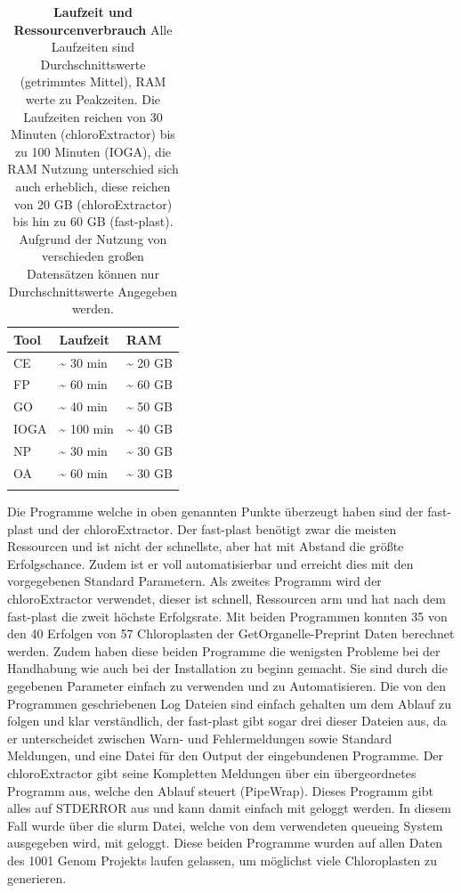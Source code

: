 \documentclass{scrartcl}
\begin{document}
\begin{table}[!h]
\caption[Laufzeit und Ressourcenverbrauch]{\textbf{Laufzeit und Ressourcenverbrauch} Alle Laufzeiten sind Durchschnittswerte (getrimmtes Mittel), RAM werte zu Peakzeiten. Die Laufzeiten reichen von 30 Minuten (chloroExtractor) bis zu 100 Minuten (IOGA), die RAM Nutzung unterschied sich auch erheblich, diese reichen von 20 GB (chloroExtractor) bis hin zu 60 GB (fast-plast). Aufgrund der Nutzung von verschieden großen Datensätzen können nur Durchschnittswerte Angegeben werden.}
\begin{center}
\begin{tabular}{lll}
Tool & Laufzeit & RAM\\
\hline
CE & \textasciitilde{}  30 min & \textasciitilde{} 20 GB\\
FP & \textasciitilde{}  60 min & \textasciitilde{} 60 GB\\
GO & \textasciitilde{}  40 min & \textasciitilde{} 50 GB\\
IOGA & \textasciitilde{} 100 min & \textasciitilde{} 40 GB\\
NP & \textasciitilde{}  30 min & \textasciitilde{} 30 GB\\
OA & \textasciitilde{}  60 min & \textasciitilde{} 30 GB\\
 &  & \\
\end{tabular}
\end{center}
\end{table}
Die Programme welche in oben genannten Punkte überzeugt haben sind der fast-plast und der chloroExtractor. Der fast-plast benötigt zwar die 
meisten Ressourcen und ist nicht der schnellste, aber hat mit Abstand die größte Erfolgschance. Zudem ist er voll automatisierbar und erreicht 
dies mit den vorgegebenen Standard Parametern. Als zweites Programm wird der chloroExtractor verwendet, dieser ist schnell, Ressourcen arm und hat nach dem
fast-plast die zweit höchste Erfolgsrate. Mit beiden Programmen konnten 35 von den 40 Erfolgen von 57 Chloroplasten der GetOrganelle-Preprint Daten berechnet werden.
Zudem haben diese beiden Programme die wenigsten
Probleme bei der Handhabung wie auch bei der Installation zu beginn gemacht. Sie sind durch die gegebenen Parameter einfach zu verwenden und zu Automatisieren.
Die von den Programmen geschriebenen Log Dateien sind einfach gehalten um dem Ablauf zu folgen und klar verständlich, der fast-plast gibt sogar drei dieser
Dateien aus, da er unterscheidet zwischen Warn- und Fehlermeldungen sowie Standard Meldungen, und eine Datei für den Output der eingebundenen Programme. 
Der chloroExtractor gibt seine Kompletten Meldungen über ein übergeordnetes Programm aus, welche den Ablauf steuert (PipeWrap). Dieses Programm gibt alles auf STDERROR aus und 
kann damit einfach mit geloggt werden. In diesem Fall wurde über die slurm Datei, welche von dem verwendeten queueing System ausgegeben wird, mit geloggt. 
Diese beiden Programme wurden auf allen Daten des 1001 Genom Projekts laufen gelassen, um möglichst viele Chloroplasten zu generieren. 
\end{document}
